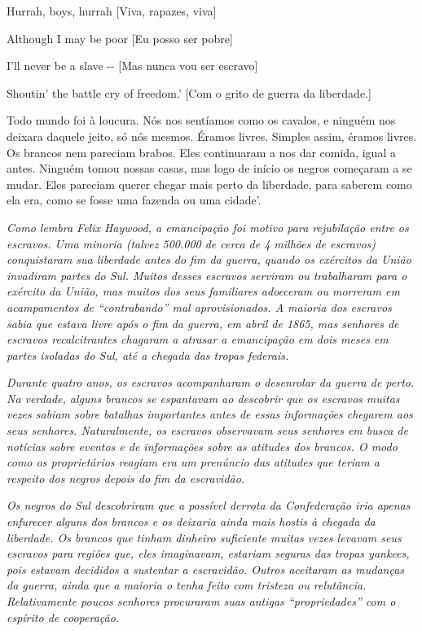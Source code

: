 Hurrah, boys, hurrah {[}Viva, rapazes, viva{]}

Although I may be poor {[}Eu posso ser pobre{]}

I'll never be a slave -\/- {[}Mas nunca vou ser escravo{]}

Shoutin' the battle cry of freedom.' {[}Com o grito de guerra da
liberdade.{]}

Todo mundo foi à loucura. Nós nos sentíamos como os cavalos, e ninguém
nos deixara daquele jeito, só nós mesmos. Éramos livres. Simples assim,
éramos livres. Os brancos nem pareciam brabos. Eles continuaram a nos
dar comida, igual a antes. Ninguém tomou nossas casas, mas logo de
início os negros começaram a se mudar. Eles pareciam querer chegar mais
perto da liberdade, para saberem como ela era, como se fosse uma fazenda
ou uma cidade'.

\emph{Como lembra Felix Haywood, a emancipação foi motivo para
rejubilação entre os escravos. Uma minoria (talvez 500.000 de cerca de 4
milhões de escravos) conquistaram sua liberdade antes do fim da guerra,
quando os exércitos da União invadiram partes do Sul. Muitos desses
escravos serviram ou trabalharam para o exército da União, mas muitos
dos seus familiares adoeceram ou morreram em acampamentos de
``contrabando'' mal aprovisionados. A maioria dos escravos sabia que
estava livre após o fim da guerra, em abril de 1865, mas senhores de
escravos recalcitrantes chagaram a atrasar a emancipação em dois meses
em partes isoladas do Sul, até a chegada das tropas federais.}

\emph{Durante quatro anos, os escravos acompanharam o desenrolar da
guerra de perto. Na verdade, alguns brancos se espantavam ao descobrir
que os escravos muitas vezes sabiam sobre batalhas importantes antes de
essas informações chegarem aos seus senhores. Naturalmente, os escravos
observavam seus senhores em busca de notícias sobre eventos e de
informações sobre as atitudes dos brancos. O modo como os proprietários
reagiam era um prenúncio das atitudes que teriam a respeito dos negros
depois do fim da escravidão.}

\emph{Os negros do Sul descobriram que a possível derrota da
Confederação iria apenas enfurecer alguns dos brancos e os deixaria
ainda mais hostis à chegada da liberdade. Os brancos que tinham dinheiro
suficiente muitas vezes levavam seus escravos para regiões que, eles
imaginavam, estariam seguras das tropas yankees, pois estavam decididos
a sustentar a escravidão. Outros aceitaram as mudanças da guerra, ainda
que a maioria o tenha feito com tristeza ou relutância. Relativamente
poucos senhores procuraram suas antigas ``propriedades'' com o espírito
de cooperação.}

